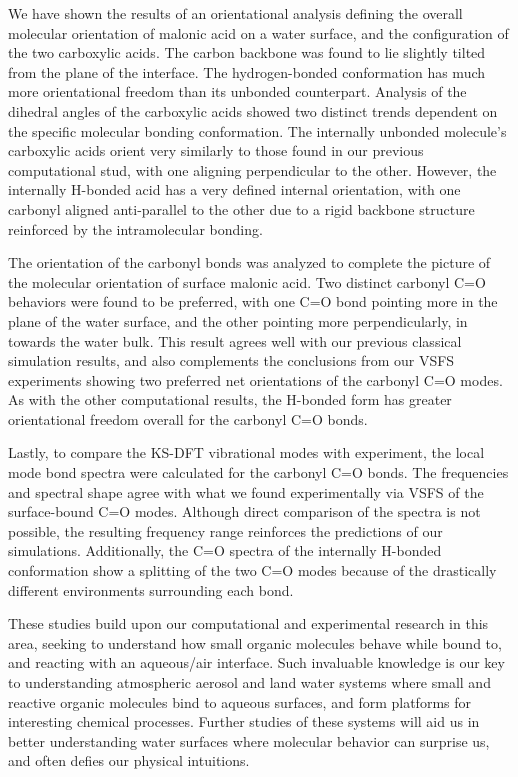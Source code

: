 We have shown the results of an orientational analysis defining the overall molecular orientation of malonic acid on a water surface, and the configuration of the two carboxylic acids. The carbon backbone was found to lie slightly tilted from the plane of the interface. The hydrogen-bonded conformation has much more orientational freedom than its unbonded counterpart. Analysis of the dihedral angles of the carboxylic acids showed two distinct trends dependent on the specific molecular bonding conformation. The internally unbonded molecule's carboxylic acids orient very similarly to those found in our previous computational stud, with one aligning perpendicular to the other. However, the internally H-bonded acid has a very defined internal orientation, with one carbonyl aligned anti-parallel to the other due to a rigid backbone structure reinforced by the intramolecular bonding.

The orientation of the carbonyl bonds was analyzed to complete the picture of the molecular orientation of surface malonic acid. Two distinct carbonyl C=O behaviors were found to be preferred, with one C=O bond pointing more in the plane of the water surface, and the other pointing more perpendicularly, in towards the water bulk. This result agrees well with our previous classical simulation results, and also complements the conclusions from our VSFS experiments showing two preferred net orientations of the carbonyl C=O modes. As with the other computational results, the H-bonded form has greater orientational freedom overall for the carbonyl C=O bonds.

Lastly, to compare the KS-DFT vibrational modes with experiment, the local mode bond spectra were calculated for the carbonyl C=O bonds. The frequencies and spectral shape agree with what we found experimentally via VSFS of the surface-bound C=O modes. Although direct comparison of the spectra is not possible, the resulting frequency range reinforces the predictions of our simulations. Additionally, the C=O spectra of the internally H-bonded conformation show a splitting of the two C=O modes because of the drastically different environments surrounding each bond.

These studies build upon our computational and experimental research in this area, seeking to understand how small organic molecules behave while bound to, and reacting with an aqueous/air interface. Such invaluable knowledge is our key to understanding atmospheric aerosol and land water systems where small and reactive organic molecules bind to aqueous surfaces, and form platforms for interesting chemical processes. Further studies of these systems will aid us in better understanding water surfaces where molecular behavior can surprise us, and often defies our physical intuitions.
